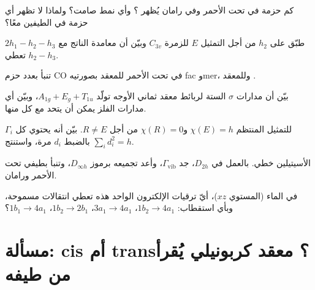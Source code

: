\begin{exercise}[$\star\star$]\label{exo:b3:group-theory-applied:6}
كم حزمة في تحت الأحمر وفي رامان يُظهر ؟ وأي نمط صامت؟ ولماذا
لا تظهر أي حزمة في الطيفين معًا؟
\end{exercise}

\begin{exercise}[$\star\star$]\label{exo:b3:group-theory-applied:7}
طبّق  على $h_2$ من أجل التمثيل $E$ للزمرة $C_{3v}$ 
وبيّن أن معامدة الناتج مع $2h_1 - h_2 - h_3$ تعطي $h_2 - h_3$.
\end{exercise}

\begin{exercise}[$\star\star$]\label{exo:b3:group-theory-applied:8}
تنبأ بعدد حزم CO في تحت الأحمر للمعقد  بصورتيه fac وmer،
وللمعقد .
\end{exercise}

\begin{exercise}[$\star\star$]\label{exo:b3:group-theory-applied:9}
بيّن أن مدارات $\sigma$ الستة لربائط معقد ثماني الأوجه تولّد
$A_{1g} + E_g + T_{1u}$، وبيّن أي مدارات الفلز يمكن أن يتحد مع كل منها.
\end{exercise}

\begin{exercise}[$\star\star\star$]\label{exo:b3:group-theory-applied:10}
للتمثيل المنتظم $\chi(E) = h$ و$\chi(R) = 0$ من أجل $R \ne E$. بيّن
 أنه يحتوي كل 
$\Gamma_i$ بالضبط $d_i$ مرة، واستنتج $\sum_id_i^2 = h$.
\end{exercise}

\begin{exercise}[$\star\star\star$]\label{exo:b3:group-theory-applied:11}
الأسيتيلين  خطي. بالعمل في $D_{2h}$، جد $\Gamma_{\mathrm{vib}}$، وأعد تجميعه
برموز $D_{\infty h}$، وتنبأ بطيفي تحت الأحمر ورامان.
\end{exercise}

\begin{exercise}[$\star\star\star$]\label{exo:b3:group-theory-applied:12}
في الماء (المستوي $xz$)، أيّ ترقيات الإلكترون الواحد هذه تعطي انتقالات
مسموحة، وبأي استقطاب: $1b_2 \to 4a_1$، $3a_1 \to 4a_1$،
$1b_2 \to 2b_1$، $1b_1 \to 4a_1$؟
\end{exercise}

\section{مسألة: cis أم trans؟ معقد كربونيلي يُقرأ من طيفه}

